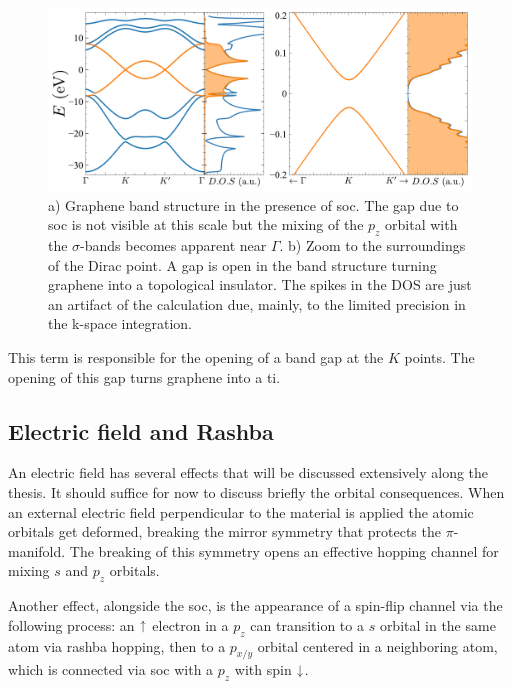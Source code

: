 \begin{figure}[h!]
\centering
\includegraphics{graphene/figures/banddos_SOC.pdf}
\vspace{-5pt}
\caption{a) Graphene band structure in the presence of \ac{soc}. The gap due to \ac{soc} is not visible at this scale but the mixing of the $p_z$ orbital with the $\sigma$-bands becomes apparent near $\Gamma$. b) Zoom to the surroundings of the Dirac point. A gap is open in the band structure turning graphene into a topological insulator. The spikes in the DOS are just an artifact of the calculation due, mainly, to the limited precision in the k-space integration.}
\label{fig:SOC}
\end{figure}
\FloatBarrier

This term is responsible for the opening of a band gap at the $K$ points. The opening of this gap turns graphene into a \ac{ti}. %


\subsection{Electric field and Rashba}  %
An electric field has several effects that will be discussed extensively along the thesis. It should suffice for now to discuss briefly the orbital consequences.
When an external electric field perpendicular to the material is applied the atomic orbitals get deformed, breaking the mirror symmetry that protects the $\pi$-manifold. The breaking of this symmetry opens an effective hopping channel for mixing $s$ and $p_z$ orbitals.

Another effect, alongside the \ac{soc}, is the appearance of a spin-flip channel via the following process: an $\uparrow$ electron in a $p_z$ can transition to a $s$ orbital in the same atom via rashba hopping, then to a $p_{x/y}$ orbital centered in a neighboring atom, which is connected via \ac{soc} with a $p_z$ with spin $\downarrow$.

